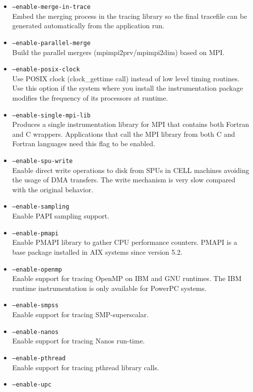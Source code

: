 \begin{itemize}
	\item {\tt --enable-merge-in-trace} \\
	Embed the merging process in the tracing library so the final tracefile can be generated automatically from the application run.
	\item {\tt --enable-parallel-merge} \\
	Build the parallel mergers (mpimpi2prv/mpimpi2dim) based on MPI.
	\item {\tt --enable-posix-clock} \\
	Use POSIX clock (clock\_gettime call) instead of low level timing routines. Use this option if the system where you install the instrumentation package modifies the frequency of its processors at runtime.
	\item {\tt --enable-single-mpi-lib} \\
	Produces a single instrumentation library for MPI that contains both Fortran and C wrappers. Applications that call the MPI library from both C and Fortran languages need this flag to be enabled.
	\item {\tt --enable-spu-write} \\
	Enable direct write operations to disk from SPUs in CELL machines avoiding the usage of DMA transfers. The write mechanism is very slow compared with the original behavior.
	\item {\tt --enable-sampling} \\
	Enable PAPI sampling support.
	\item {\tt --enable-pmapi} \\
	Enable PMAPI library to gather CPU performance counters. PMAPI is a base package installed in AIX systems since version 5.2.
	\item {\tt --enable-openmp} \\
	Enable support for tracing OpenMP on IBM and GNU runtimes. The IBM runtime instrumentation is only available for PowerPC systems.
	\item {\tt --enable-smpss} \\
	Enable support for tracing SMP-superscalar.
	\item {\tt --enable-nanos} \\
	Enable support for tracing Nanos run-time.
	\item {\tt --enable-pthread} \\
	Enable support for tracing pthread library calls.
	\item {\tt --enable-upc} \\

\end{itemize}
